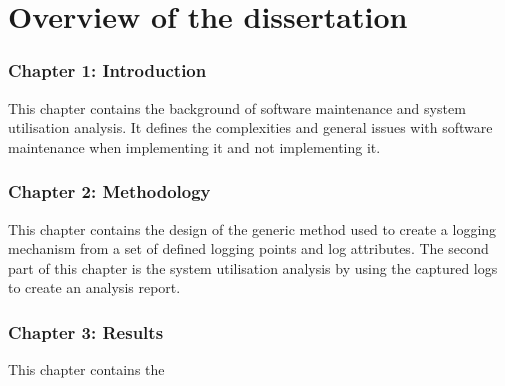 \section{Overview of the dissertation}
\subsubsection{Chapter 1: Introduction}
This chapter contains the background of software maintenance and system utilisation analysis. It defines the complexities and general issues with software maintenance when implementing it and not implementing it.

\subsubsection{Chapter 2: Methodology}
This chapter contains the design of the generic method used to create a logging mechanism from a set of defined logging points and log attributes. The second part of this chapter is the system utilisation analysis by using the captured logs to create an analysis report.

\subsubsection{Chapter 3: Results}
This chapter contains the 
